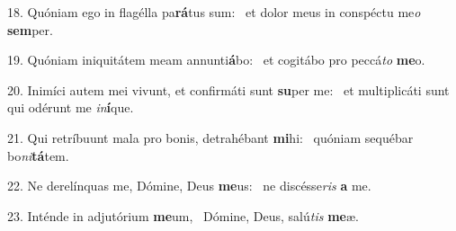 18. Quóniam ego in flagélla pa\textbf{rá}tus sum: \ast\  et dolor meus in conspéctu me\textit{o} \textbf{sem}per.\

19. Quóniam iniquitátem meam annunti\textbf{á}bo: \ast\  et cogitábo pro peccá\textit{to} \textbf{me}o.\

20. Inimíci autem mei vivunt, et confirmáti sunt \textbf{su}per me: \ast\  et multiplicáti sunt qui odérunt me \textit{in}\textbf{í}que.\

21. Qui retríbuunt mala pro bonis, detrahébant \textbf{mi}hi: \ast\  quóniam sequébar bo\textit{ni}\textbf{tá}tem.\

22. Ne derelínquas me, Dómine, Deus \textbf{me}us: \ast\  ne discésse\textit{ris} \textbf{a} me.\

23. Inténde in adjutórium \textbf{me}um, \ast\  Dómine, Deus, salú\textit{tis} \textbf{me}æ.\

